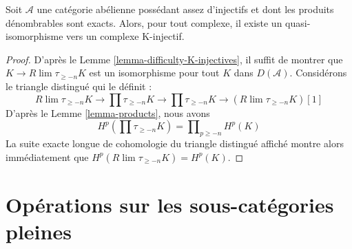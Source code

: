 \begin{lemma}
\label{lemma-enough-K-injectives-Ab4-star}
Soit $\mathcal{A}$ une catégorie abélienne possédant assez d'injectifs et dont
les produits dénombrables sont exacts. Alors, pour tout complexe, il existe un
quasi-isomorphisme vers un complexe K-injectif.
\end{lemma}

\begin{proof}
D'après le Lemme \ref{lemma-difficulty-K-injectives}, il suffit de montrer que
$K \to R\lim\tau_{\geq -n}K$ est un isomorphisme pour tout $K$ dans
$D(\mathcal{A})$. Considérons le triangle distingué qui le définit :
$$
R\lim\tau_{\geq -n}K \to
\prod \tau_{\geq -n}K \to
\prod \tau_{\geq -n}K \to
(R\lim\tau_{\geq -n}K)[1]
$$
D'après le Lemme \ref{lemma-products}, nous avons
$$
H^p(\prod \tau_{\geq -n}K) =
\prod\nolimits_{p \geq -n} H^p(K)
$$
La suite exacte longue de cohomologie du triangle distingué affiché montre
alors immédiatement que $H^p(R\lim \tau_{\geq -n}K) = H^p(K)$.
\end{proof}

\section{Opérations sur les sous-catégories pleines}
\label{section-operate-on-full}

